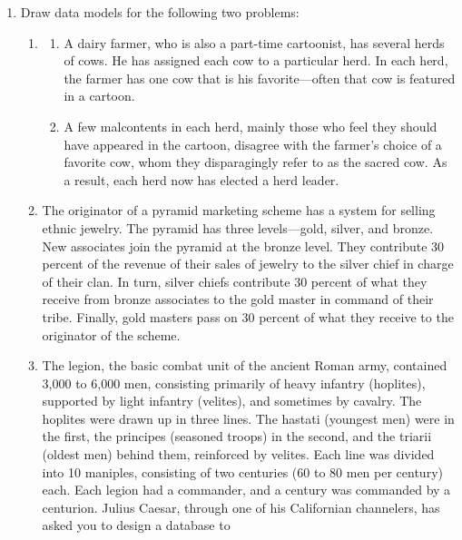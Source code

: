 \documentclass[
]{article}
\begin{document}
\begin{enumerate}
\def\labelenumi{\arabic{enumi}.}
\item
  Draw data models for the following two problems:

  \begin{enumerate}
  \def\labelenumii{\alph{enumii}.}
  \item
    \begin{enumerate}
    \def\labelenumiii{(\roman{enumiii})}
    \item
      A dairy farmer, who is also a part-time cartoonist, has
      several herds of cows. He has assigned each cow to a
      particular herd. In each herd, the farmer has one cow that
      is his favorite---often that cow is featured in a cartoon.\\
    \item
      A few malcontents in each herd, mainly those who feel they
      should have appeared in the cartoon, disagree with the
      farmer's choice of a favorite cow, whom they disparagingly
      refer to as the sacred cow. As a result, each herd now has
      elected a herd leader.
    \end{enumerate}
  \item
    The originator of a pyramid marketing scheme has a system for
    selling ethnic jewelry. The pyramid has three levels---gold,
    silver, and bronze. New associates join the pyramid at the
    bronze level. They contribute 30 percent of the revenue of their
    sales of jewelry to the silver chief in charge of their clan. In
    turn, silver chiefs contribute 30 percent of what they receive
    from bronze associates to the gold master in command of their
    tribe. Finally, gold masters pass on 30 percent of what they
    receive to the originator of the scheme.
  \item
    The legion, the basic combat unit of the ancient Roman army,
    contained 3,000 to 6,000 men, consisting primarily of heavy
    infantry (hoplites), supported by light infantry (velites), and
    sometimes by cavalry. The hoplites were drawn up in three lines.
    The hastati (youngest men) were in the first, the principes
    (seasoned troops) in the second, and the triarii (oldest men)
    behind them, reinforced by velites. Each line was divided into
    10 maniples, consisting of two centuries (60 to 80 men per
    century) each. Each legion had a commander, and a century was
    commanded by a centurion. Julius Caesar, through one of his
    Californian channelers, has asked you to design a database to

\end{enumerate}
\end{enumerate}
\end{document}
